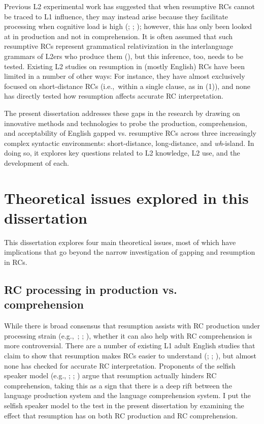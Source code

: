 Previous L2 experimental work has suggested that when resumptive RCs cannot be traced to L1 influence, they may instead arise because they facilitate processing when cognitive load is high (\cite{algady2013}; \cite{hyltenstam1984,hyltenstam1990}; \cite{maghrabi1997}); however, this has only been looked at in production and not in comprehension. It is often assumed that such resumptive RCs represent grammatical relativization in the interlanguage grammars of L2ers who produce them (\cite{eckman2004,hyltenstam1984,hyltenstam1990}), but this inference, too, needs to be tested. Existing L2 studies on resumption in (mostly English) RCs have been limited in a number of other ways: For instance, they have almost exclusively focused on short-distance RCs (i.e.,~within a single clause, as in (1)), and none has directly tested how resumption affects accurate RC interpretation.

The present dissertation addresses these gaps in the research by drawing on innovative methods and technologies to probe the production, comprehension, and acceptability of English gapped vs. resumptive RCs across three increasingly complex syntactic environments: short-distance, long-distance, and \textit{wh}-island. In doing so, it explores key questions related to L2 knowledge, L2 use, and the development of each.

\section{Theoretical issues explored in this dissertation}

This dissertation explores four main theoretical issues, most of which have implications that go beyond the narrow investigation of gapping and resumption in RCs.

\subsection{RC processing in production vs. comprehension}

While there is broad consensus that resumption assists with RC production under processing strain (e.g.,~\cite{asudeh2004}; \cite{ferreira.swets2005}; \cite{zukowski.larsen2004}), whether it can also help with RC comprehension is more controversial. There are a number of existing L1 adult English studies that claim to show that resumption makes RCs easier to understand (\cite{beltrama.xiang2016}; \cite{hammerly2022}; \cite{hofmeister.norcliffe2013}), but almost none has checked for accurate RC interpretation. Proponents of the selfish speaker model (e.g., \cite{ferreira.swets2005}; \cite{polinsky.etal2013}; \cite{morgan.etal2020}) argue that resumption actually hinders RC comprehension, taking this as a sign that there is a deep rift between the language production system and the language comprehension system. I put the selfish speaker model to the test in the present dissertation by examining the effect that resumption has on both RC production and RC comprehension.

